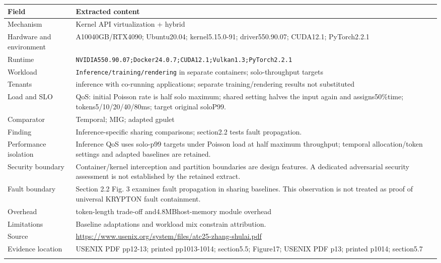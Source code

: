 \cite{P014}

\begin{longtable}{>{\raggedright\arraybackslash}p{}>{\raggedright\arraybackslash}p{}}
\toprule
\textbf{Field} & \textbf{Extracted content}\\\midrule\endhead
Mechanism & Kernel API virtualization + hybrid\\\addlinespace
Hardware and environment & A10040GB/RTX4090; Ubuntu20.04; kernel5.15.0-91; driver550.90.07; CUDA12.1; PyTorch2.2.1\\\addlinespace
Runtime & \nolinkurl{NVIDIA550.90.07;Docker24.0.7;CUDA12.1;Vulkan1.3;PyTorch2.2.1}\\\addlinespace
Workload & \nolinkurl{Inference/training/rendering} in separate containers; solo-throughput targets\\\addlinespace
Tenants & inference with co-running applications; separate training/rendering results not substituted\\\addlinespace
Load and SLO & QoS: initial Poisson rate is half solo maximum; shared setting halves the input again and assigns50\%time; tokens5/10/20/40/80ms; target original soloP99.\\\addlinespace
Comparator & Temporal; MIG; adapted gpulet\\\addlinespace
Finding & Inference-specific sharing comparisons; section2.2 tests fault propagation.\\\addlinespace
Performance isolation & Inference QoS uses solo-p99 targets under Poisson load at half maximum throughput; temporal allocation/token settings and adapted baselines are retained.\\\addlinespace
Security boundary & Container/kernel interception and partition boundaries are design features. A dedicated adversarial security assessment is not established by the retained extract.\\\addlinespace
Fault boundary & Section 2.2 Fig. 3 examines fault propagation in sharing baselines. This observation is not treated as proof of universal KRYPTON fault containment.\\\addlinespace
Overhead & token-length trade-off and4.8MBhost-memory module overhead\\\addlinespace
Limitations & Baseline adaptations and workload mix constrain attribution.\\\addlinespace
Source & \url{https://www.usenix.org/system/files/atc25-zhang-shulai.pdf}\\\addlinespace
Evidence location & USENIX PDF pp12-13; printed pp1013-1014; section5.5; Figure17; USENIX PDF p13; printed p1014; section5.7\\\addlinespace
\bottomrule\end{longtable}

